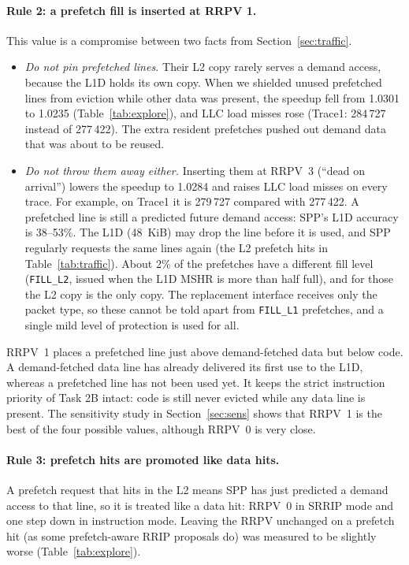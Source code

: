 \documentclass[11pt]{article}
\begin{document}
\paragraph{Rule 2: a prefetch fill is inserted at RRPV 1.} This value is a compromise between two
facts from Section~\ref{sec:traffic}.
\begin{itemize}
  \item \emph{Do not pin prefetched lines.} Their L2 copy rarely serves a demand access, because
        the L1D holds its own copy. When we shielded unused prefetched lines from eviction while
        other data was present, the speedup fell from 1.0301 to 1.0235 (Table~\ref{tab:explore}), and LLC load misses rose
        (Trace1: 284\,727 instead of 277\,422). The extra resident prefetches pushed out demand data that was
        about to be reused.
  \item \emph{Do not throw them away either.} Inserting them at RRPV~3 (``dead on arrival'')
        lowers the speedup to 1.0284 and raises LLC load misses on every trace. For example, on
        Trace1 it is 279\,727 compared with 277\,422. A prefetched line is still a predicted
        future demand access: SPP's L1D accuracy is 38--53\%. The L1D (48~KiB) may drop the line
        before it is used, and SPP regularly requests the same lines again (the L2 prefetch hits
        in Table~\ref{tab:traffic}). About 2\% of the prefetches have a different fill level
        (\texttt{FILL\_L2}, issued when the L1D MSHR is more than half full), and for those the L2 copy
        is the only copy. The
        replacement interface receives only the packet type, so these cannot be told apart from
        \texttt{FILL\_L1} prefetches, and a single mild level of protection is used for all.
\end{itemize}
RRPV~1 places a prefetched line just above demand-fetched data but below code. A demand-fetched
data line has already delivered its first use to the L1D, whereas a prefetched line has not been
used yet. It keeps the strict instruction priority of Task 2B intact: code is still never
evicted while any data line is present. The sensitivity study in Section~\ref{sec:sens} shows
that RRPV~1 is the best of the four possible values, although RRPV~0 is very close.

\paragraph{Rule 3: prefetch hits are promoted like data hits.} A prefetch request that hits in the
L2 means SPP has just predicted a demand access to that line, so it is treated like a data hit:
RRPV~0 in SRRIP mode and one step down in instruction mode. Leaving the RRPV unchanged on a
prefetch hit (as some prefetch-aware RRIP proposals do) was measured to be slightly worse
(Table~\ref{tab:explore}).
\end{document}

